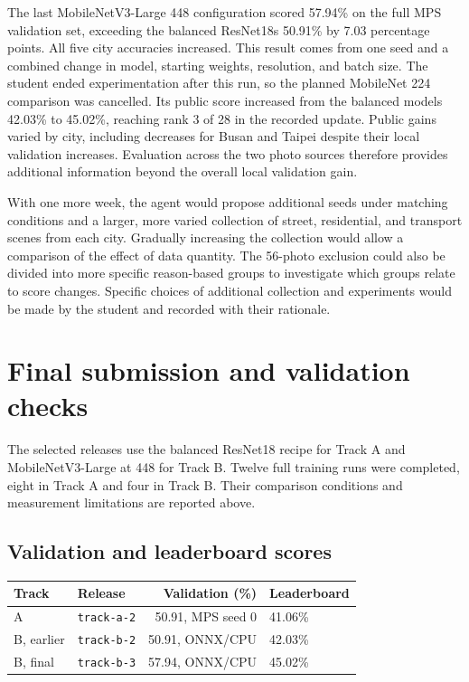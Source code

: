 \documentclass[11pt]{article}
\begin{document}
The last MobileNetV3-Large 448 configuration scored 57.94\% on the full
MPS validation set, exceeding the balanced ResNet18\textquotesingle{}s 50.91\% by
7.03 percentage points. All five city accuracies increased. This result
comes from one seed and a combined change in model, starting weights,
resolution, and batch size. The student ended experimentation after this
run, so the planned MobileNet 224 comparison was cancelled.
Its public score increased from the balanced model\textquotesingle{}s 42.03\% to
45.02\%, reaching rank 3 of 28 in the recorded update. Public gains varied
by city, including decreases for Busan and Taipei despite their local
validation increases. Evaluation across the two photo sources therefore
provides additional information beyond the overall local validation gain.

With one more week, the agent would propose additional seeds under matching
conditions and a larger, more varied collection of street, residential,
and transport scenes from each city. Gradually increasing the collection
would allow a comparison of the effect of data quantity. The 56-photo
exclusion could also be divided into more specific reason-based groups to
investigate which groups relate to score changes. Specific choices of
additional collection and experiments would be made by the student and
recorded with their rationale.

\section{Final submission and validation checks}

The selected releases use the balanced ResNet18 recipe for Track A and
MobileNetV3-Large at 448 for Track B. Twelve full training runs were
completed, eight in Track A and four in Track B. Their comparison conditions
and measurement limitations are reported above.

\subsection{Validation and leaderboard scores}

\begin{center}\small
\begin{tabular}{llrl}
\toprule
Track & Release & Validation (\%) & Leaderboard \\
\midrule
A & \texttt{track-a-2} & 50.91, MPS seed 0 & 41.06\% \\
B, earlier & \texttt{track-b-2} & 50.91, ONNX/CPU & 42.03\% \\
B, final & \texttt{track-b-3} & 57.94, ONNX/CPU & 45.02\% \\
\bottomrule
\end{tabular}
\end{center}
\end{document}
